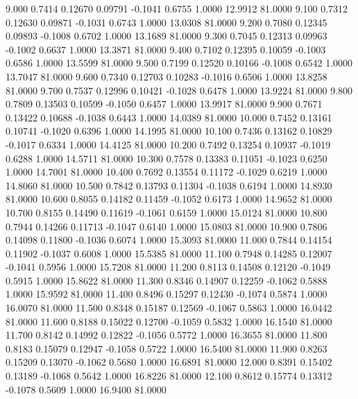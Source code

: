    9.000   0.7414   0.12670   0.09791  -0.1041   0.6755   1.0000  12.9912  81.0000
   9.100   0.7312   0.12630   0.09871  -0.1031   0.6743   1.0000  13.0308  81.0000
   9.200   0.7080   0.12345   0.09893  -0.1008   0.6702   1.0000  13.1689  81.0000
   9.300   0.7045   0.12313   0.09963  -0.1002   0.6637   1.0000  13.3871  81.0000
   9.400   0.7102   0.12395   0.10059  -0.1003   0.6586   1.0000  13.5599  81.0000
   9.500   0.7199   0.12520   0.10166  -0.1008   0.6542   1.0000  13.7047  81.0000
   9.600   0.7340   0.12703   0.10283  -0.1016   0.6506   1.0000  13.8258  81.0000
   9.700   0.7537   0.12996   0.10421  -0.1028   0.6478   1.0000  13.9224  81.0000
   9.800   0.7809   0.13503   0.10599  -0.1050   0.6457   1.0000  13.9917  81.0000
   9.900   0.7671   0.13422   0.10688  -0.1038   0.6443   1.0000  14.0389  81.0000
  10.000   0.7452   0.13161   0.10741  -0.1020   0.6396   1.0000  14.1995  81.0000
  10.100   0.7436   0.13162   0.10829  -0.1017   0.6334   1.0000  14.4125  81.0000
  10.200   0.7492   0.13254   0.10937  -0.1019   0.6288   1.0000  14.5711  81.0000
  10.300   0.7578   0.13383   0.11051  -0.1023   0.6250   1.0000  14.7001  81.0000
  10.400   0.7692   0.13554   0.11172  -0.1029   0.6219   1.0000  14.8060  81.0000
  10.500   0.7842   0.13793   0.11304  -0.1038   0.6194   1.0000  14.8930  81.0000
  10.600   0.8055   0.14182   0.11459  -0.1052   0.6173   1.0000  14.9652  81.0000
  10.700   0.8155   0.14490   0.11619  -0.1061   0.6159   1.0000  15.0124  81.0000
  10.800   0.7944   0.14266   0.11713  -0.1047   0.6140   1.0000  15.0803  81.0000
  10.900   0.7806   0.14098   0.11800  -0.1036   0.6074   1.0000  15.3093  81.0000
  11.000   0.7844   0.14154   0.11902  -0.1037   0.6008   1.0000  15.5385  81.0000
  11.100   0.7948   0.14285   0.12007  -0.1041   0.5956   1.0000  15.7208  81.0000
  11.200   0.8113   0.14508   0.12120  -0.1049   0.5915   1.0000  15.8622  81.0000
  11.300   0.8346   0.14907   0.12259  -0.1062   0.5888   1.0000  15.9592  81.0000
  11.400   0.8496   0.15297   0.12430  -0.1074   0.5874   1.0000  16.0070  81.0000
  11.500   0.8348   0.15187   0.12569  -0.1067   0.5863   1.0000  16.0442  81.0000
  11.600   0.8188   0.15022   0.12700  -0.1059   0.5832   1.0000  16.1540  81.0000
  11.700   0.8142   0.14992   0.12822  -0.1056   0.5772   1.0000  16.3655  81.0000
  11.800   0.8183   0.15079   0.12947  -0.1058   0.5722   1.0000  16.5400  81.0000
  11.900   0.8263   0.15209   0.13070  -0.1062   0.5680   1.0000  16.6891  81.0000
  12.000   0.8391   0.15402   0.13189  -0.1068   0.5642   1.0000  16.8226  81.0000
  12.100   0.8612   0.15774   0.13312  -0.1078   0.5609   1.0000  16.9400  81.0000
